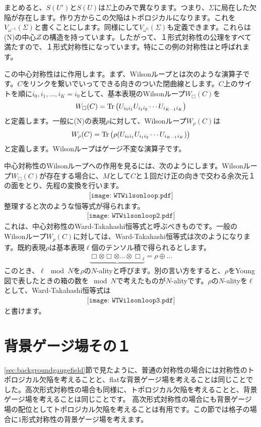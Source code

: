 \documentclass[generalized_symmetry.tex]{subfiles}
\begin{document}
まとめると、$S(U')$と$S(U)$は$\Sigma$上のみで異なります。つまり、$\Sigma$に局在した欠陥が存在します。作り方からこの欠陥はトポロジカルになります。これを$V_{\omega^{-1}}(\Sigma)$と書くことにします。同様にして$V_{\omega^{n}}(\Sigma)$も定義できます。これらは\SU(N)の中心$\mathcal{Z}$の構造を持っています。したがって、１形式対称性の公理をすべて満たすので、１形式対称性になっています。特にこの例の対称性はと呼ばれます。

この中心対称性はに作用します。まず、Wilsonループとは次のような演算子です。$C$をリンクを繋いでいってできる向きのついた閉曲線とします。$C$上のサイトを順に$i_0,i_1,\dots,i_K=i_0$として、基本表現のWilsonループ$W_{\Box}(C)$を
\begin{align}
    W_{\Box}(C) = \Tr\left( U_{i_0 i_1} U_{i_1 i_2} \cdots U_{i_{K-1} i_K}\right)
\end{align}
と定義します。一般に\SU(N)の表現$\rho$に対して、Wilsonループ$W_{\rho}(C)$は
\begin{align}
    W_{\rho}(C) = \Tr\left( \rho(U_{i_0 i_1} U_{i_1 i_2} \cdots U_{i_{K-1} i_K})\right)
\end{align}
と定義します。Wilsonループはゲージ不変な演算子です。

中心対称性のWilsonループへの作用を見るには、次のようにします。Wilsonループ$W_{\Box}(C)$が存在する場合に、$M$として$C$と１回だけ正の向きで交わる余次元１の面をとり、先程の変換を行います。
\begin{align}
    \texttt{[image: WTWilsonloop.pdf]}
\end{align}
整理すると次のような恒等式が得られます。
\begin{align}
    \texttt{[image: WTWilsonloop2.pdf]}
\end{align}
これは、中心対称性のWard-Takahashi恒等式と呼ぶべきものです。一般のWilsonループ$W_{\rho}(C)$に対しては、Ward-Takahashi恒等式は次のようになります。既約表現$\rho$は基本表現$\ell$個のテンソル積で得られるとします。
\begin{align}
    \underbrace{{
    \Box \otimes \Box \otimes \dots \otimes \Box}_{\ell}} = \rho \oplus \dots
\end{align}
このとき、$\ell \mod{N}$を$\rho$の$N$-alityと呼びます。別の言い方をすると、$\rho$をYoung図で表したときの箱の数を$\mod{N}$で考えたものが$N$-alityです。$\rho$の$N$-alityを$\ell$として、Ward-Takahashi恒等式は
\begin{align}
    \texttt{[image: WTWilsonloop3.pdf]}
\end{align}
と書けます。
\section{背景ゲージ場その１}
\ref{sec:backgroundgaugefield}節で見たように、普通の対称性の場合には対称性のトポロジカル欠陥を考えることと、flatな背景ゲージ場を考えることは同じことでした。高次形式対称性の場合も同様に、トポロジカル欠陥を考えることと、背景ゲージ場を考えることは同じことです。
高次形式対称性の場合にも背景ゲージ場の配位としてトポロジカル欠陥を考えることは有用です。この節では格子の場合に$1$形式対称性の背景ゲージ場を考えます。
\end{document}
